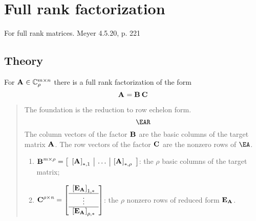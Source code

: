 \section[$\A{}=\B{}\C{}$]{Full rank factorization}
For full rank matrices. Meyer 4.5.20, p. 221

\subsection{Theory}
For $\A{}\in\cmplx{\bymn}_{\rho}$ there is a full rank factorization of the form
\begin{equation}
  \A{}=\B{}\,\C{}
\end{equation}
\begin{quote}
The foundation is the reduction to row echelon form.
\begin{equation}
  \EAR 
\end{equation}
The column vectors of the factor $\B{}$ are the basic columns of the target matrix $\A{}$. The row vectors of the factor $\C{}$ are the nonzero rows of $\EA$.

\begin{enumerate}
\item $\B{\byt{m}{\rho}} = \mat{c|c|c}{\brac{\A{}}_{*,1}&\dots&\brac{\A{}}_{*,\rho}}$: the $\rho$ basic columns of the target matrix;
\item $\C{\byt{\rho}{n}} = \mat{c}{\brac{\E{\A{}}}_{1,*}\\\hline\vdots\\\hline\brac{\E{\A{}}}_{\rho,*}}$: the $\rho$ nonzero rows of reduced form $\E{\A{}}$.
\end{enumerate}

\end{quote}

